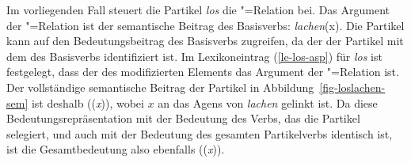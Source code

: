 Im vorliegenden Fall steuert die Partikel \emph{los} die "=Relation bei.
Das Argument der "=Relation ist der semantische Beitrag des Basisverbs:
\emph{lachen}(x). Die Partikel kann auf den Bedeutungsbeitrag
des Basisverbs zugreifen, da der \modw der Partikel mit dem \synsemw des Basisverbs 
identifiziert ist. Im Lexikoneintrag (\ref{le-los-asp}) für \emph{los} ist festgelegt,
dass der \contw des modifizierten Elements das Argument der "=Relation ist.
Der vollständige semantische Beitrag der Partikel in Abbildung~\ref{fig-loslachen-sem} 
ist deshalb ((\emph{x})), wobei $x$ an das Agens von \emph{lachen} gelinkt ist.
Da diese Bedeutungsrepräsentation mit der Bedeutung des Verbs, das die Partikel selegiert,
und auch mit der Bedeutung des gesamten Partikelverbs identisch ist, ist die Gesamtbedeutung
also ebenfalls ((\emph{x})).

